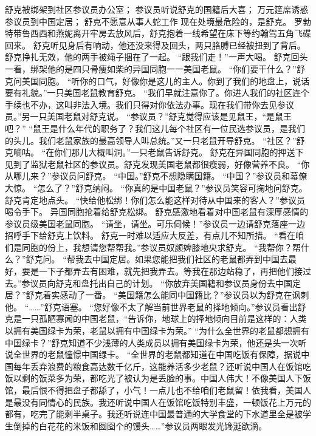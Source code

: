 \documentclass[a4paper,12pt,UTF8,twoside]{ctexbook}
\begin{document}
        舒克被绑架到社区参议员办公室；  
        参议员听说舒克的国籍后大喜；  
        万元筵席诱惑参议员到中国定居；  
        舒克不愿意从事人蛇工作    
        现在处境最危险的，是舒克。  
        罗勃特带鲁西西和燕妮离开牢房去放风后，舒克抱着一线希望在床下等约翰驾五角飞碟回来。  
        舒克听见身后有响动，他还没来得及回头，两只胳膊已经被扭到了背后。舒克挣扎无效，他的两手被绳子捆在了一起。  
        “跟我们走！”一声大喝。  
        舒克回头一看，绑架他的是四只骨瘦如柴的异国同胞一一美国老鼠。  
        “你们要干什么？”舒克问美国同胞。  
        “听你的口气，好像你是这儿的主人。你到了我们的地盘上，说话要有礼貌。”一只美国老鼠教育舒克。  
        “我们早就注意你了。你进人我们的社区连个手续也不办，这叫非法入境。我们只得对你依法办事。现在我们带你去见参议员。”另一只美国老鼠对舒克说。  
        “参议员？”舒克觉得应该是见鼠王，“是鼠王吧？”  
        “鼠王是什么年代的职务了？我们这儿每个社区有一位民选参议员，是我们的头儿。我们老鼠家族的最高领导人叫总统。”又一只老鼠开导舒克。  
        “社区？”舒克嘀咕。  
        “在你们那儿大概叫洞。”一只老鼠告诉舒克。  
        舒克在异国同胞的押送下见到了监狱老鼠社区的参议员。舒克发现美国老鼠都很瘦弱，好像营养不良。  
        “你从哪儿来？”参议员问舒克。  
        “中国。”舒克不想隐瞒国籍。  
        “中国？”参议员和幕僚大惊。  
        “怎么了？”舒克纳闷。  
        “你真的是中国老鼠？”参议员笑容可掬地问舒克。  
        舒克肯定地点头。  
        “快给他松绑！你们怎么能这样对待从中国来的客人？”参议员喝令手下。  
        异国同胞抢着给舒克松绑。  
        舒克感激地看着对中国老鼠有深厚感情的参议员级美国老鼠同胞。  
        “请坐，请坐。可乐伺候！”参议员一边请舒克落座一边招呼手下给舒克上饮料。  
        舒克一时难以适应大反差，有点儿不知所措。  
        “看在咱们是同胞的份上，我想请您帮帮我。”参议员奴颜婢膝地央求舒克。  
        “我帮你？帮什么？”舒克问。  
        “帮我去中国定居。如果您能把我们社区的老鼠都弄到中国去最好，要是一下子都弄去有困难，就先把我弄去。等我在那边站稳了，再把他们接过去。”参议员向舒克和盘托出自己的计划。  
        “你放弃美国籍和参议员身份去中国定居？”舒克着实感动了一番。  
        “美国籍怎么能同中国籍比？”参议员以为舒克在讽刺他。  
        “……”舒克语塞。  
        “您好像不太了解当前世界老鼠的择地倾向。”参议员看出舒克是一只孤陋寡闻的中国老鼠，“告诉你，地球上的择地倾向目前是这样的：人类以拥有美国绿卡为荣，老鼠以拥有中国绿卡为荣。”  
        “为什么全世界的老鼠都想拥有中国绿卡？”舒克知道不少浅薄的人类成员以拥有美国绿卡为荣，他还是头一次听说全世界的老鼠憧憬中国绿卡。  
        “全世界的老鼠都知道在中国吃饭有保障，据说中国每年丢弃浪费的粮食高达数千亿斤，这能养活多少老鼠？还听说中国人在饭馆吃饭以剩的饭菜多为荣，都吃光了被认为是丢脸的事。中国人伟大！不像美国人下饭馆，最后恨不得把盘子都舔了，小气！一点儿也不给咱们老鼠留！依我看，美国人是最没有同情心的民族。我还听说中国人在饭馆吃饭特别丰盛，一顿饭花上万元的都有，吃完了能剩半桌子。我还听说连中国最普通的大学食堂的下水道里全是被学生倒掉的白花花的米饭和囫囵个的馒头……”参议员两眼发光馋涎欲滴。  
\end{document}
